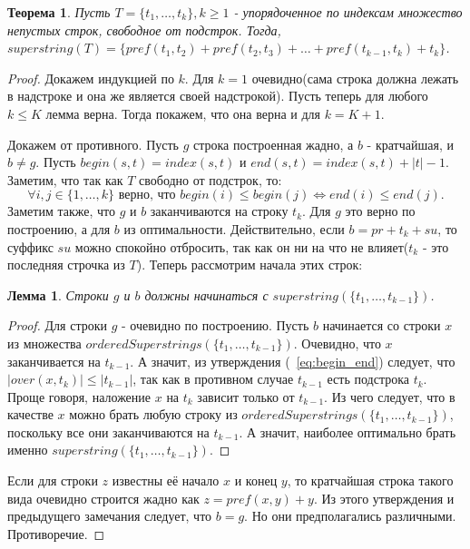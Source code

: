 \documentclass[a4paper,10pt]{article}
\newtheorem{theorem}{Теорема}
\newtheorem{lemma}{Лемма}
\begin{document}
\begin{theorem}
Пусть $T = \{t_1,\dots,t_k\}, k \geq 1$ - упорядоченное по индексам множество непустых строк, свободное от подстрок.
Тогда, $superstring(T) = \{ pref(t_1, t_2)+pref(t_2, t_3)+\dots+pref(t_{k-1}, t_k)+t_k\}$. 
\end{theorem}

\begin{proof}
Докажем индукцией по $k$.
Для $k = 1$ очевидно(сама строка должна лежать в надстроке и она же является своей надстрокой).
Пусть теперь для любого $k \leq K$ лемма верна. Тогда покажем, что она верна и для $k = K + 1$.

Докажем от противного. Пусть $g$ строка построенная жадно, а $b$ - кратчайшая, и $b \ne g$.
Пусть $begin(s, t) = index(s, t)$ и $end(s, t) = index(s, t) + |t| - 1$.
Заметим, что так как $T$ свободно от подстрок, то:
\begin{equation} \label{eq:begin_end}
	 \forall i,j \in \{ 1, \dots, k \} \mbox{ верно, что } begin(i) \leq begin(j) \iff end(i) \leq end(j).
\end{equation}
Заметим также, что $g$ и $b$ заканчиваются на строку $t_k$. Для $g$ это верно по построению, а для $b$ из оптимальности. 
Действительно, если $b = pr + t_k + su$, то суффикс $su$ можно спокойно отбросить, так как он ни на что не влияет($t_k$ - это последняя строчка из $T$).
Теперь рассмотрим начала этих строк:

\begin{lemma}
Строки $g$ и $b$ должны начинаться с $superstring(\{ t_1, \dots, t_{k-1} \})$.
\end{lemma}

\begin{proof}
Для строки $g$ - очевидно по построению.
Пусть $b$ начинается со строки $x$ из множества $orderedSuperstrings(\{ t_1, \dots, t_{k-1} \})$.
Очевидно, что $x$ заканчивается на $t_{k-1}$.
А значит, из утверждения (~\ref{eq:begin_end}) следует, что $|over(x, t_k)| \leq |t_{k-1}|$, так как в противном случае $t_{k-1}$ есть подстрока $t_k$.
Проще говоря, наложение $x$ на $t_k$ зависит только от $t_{k-1}$.
Из чего следует, что в качестве $x$ можно брать любую строку из $orderedSuperstrings(\{ t_1, \dots, t_{k-1} \})$, поскольку все они заканчиваются на $t_{k-1}$.
А значит, наиболее оптимально брать именно $superstring(\{ t_1, \dots, t_{k-1} \})$.
\end{proof}

Если для строки $z$ известны её начало $x$ и конец $y$, то кратчайшая строка такого вида очевидно строится жадно как $z = pref(x, y) + y$.
Из этого утверждения и предыдущего замечания следует, что $b = g$. Но они предполагались различными. Противоречие.
\end{proof}
\end{document}
